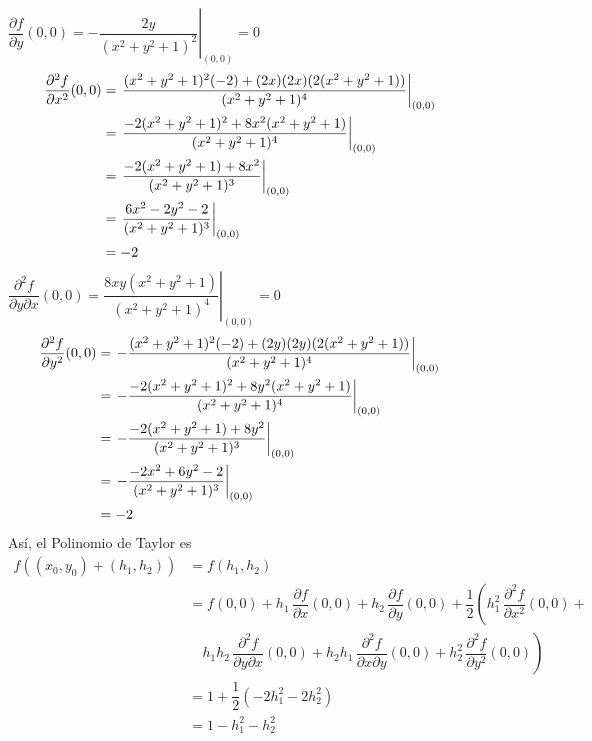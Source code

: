 \documentclass[fleqn, 12pt]{article}
\newcommand{\derivadaparcial}[2]{\dfrac{\partial {#1}}{\partial {#2}}}
\newcommand{\derivadaparcialn}[3]{\dfrac{\partial^{#3} {#1}}{\partial {#2}^{#3}}}
\newcommand{\derivadaparcialnd}[3]{\dfrac{\partial^{2} {#1}}{\partial {#3} \partial {#2}}}
\begin{document}
\begin{enumerate}
        $ \derivadaparcial{f}{y} (0,0) = \left. - \dfrac{2y}{(x^2 + y^2 + 1)^2} \right|_{(0,0)} = 0 $
        \begin{align*}
            \hspace{-10mm} \derivadaparcialn{f}{x}{2} (0,0) &= \left. \dfrac{(x^2 + y^2 + 1)^2 (-2) + (2x)(2x)(2(x^2 + y^2 + 1))}{(x^2 + y^2 + 1)^4} \right|_{(0,0)} \\
            &= \left. \dfrac{-2(x^2 + y^2 + 1)^2 + 8x^2 (x^2 + y^2 + 1)}{(x^2 + y^2 + 1)^4} \right|_{(0,0)} \\
            &= \left. \dfrac{-2(x^2 + y^2 + 1) + 8x^2}{(x^2 + y^2 + 1)^3} \right|_{(0,0)} \\
            &= \left. \dfrac{6x^2 - 2y^2 - 2}{(x^2 + y^2 + 1)^3} \right|_{(0,0)} \\
            &= -2
        \end{align*}
        $ \derivadaparcialnd{f}{x}{y} (0,0) = \left. \dfrac{8xy(x^2 + y^2 + 1)}{(x^2 + y^2 + 1)^4} \right|_{(0,0)} = 0 $
        \begin{align*}
            \hspace{-10mm} \derivadaparcialn{f}{y}{2} (0,0) &= \left. - \dfrac{(x^2 + y^2 + 1)^2 (-2) + (2y)(2y)(2(x^2 + y^2 + 1))}{(x^2 + y^2 + 1)^4} \right|_{(0,0)} \\
            &= \left. - \dfrac{-2(x^2 + y^2 + 1)^2 + 8y^2 (x^2 + y^2 + 1)}{(x^2 + y^2 + 1)^4} \right|_{(0,0)} \\
            &= \left. - \dfrac{-2(x^2 + y^2 + 1) + 8y^2}{(x^2 + y^2 + 1)^3} \right|_{(0,0)} \\
            &= \left. - \dfrac{-2x^2 + 6y^2 - 2}{(x^2 + y^2 + 1)^3} \right|_{(0,0)} \\
            &= -2
        \end{align*}
        Así, el Polinomio de Taylor es
        \begin{align*}
            f((x_0, y_0) + (h_1, h_2)) &= f(h_1, h_2) \\
            &= f(0,0) + h_1 \, \derivadaparcial{f}{x} (0,0) + h_2 \, \derivadaparcial{f}{y} (0,0) + \dfrac{1}{2} \left( h_1^2 \, \derivadaparcialn{f}{x}{2} (0,0) \right. + \\
            & \quad \left. h_1 h_2 \, \derivadaparcialnd{f}{x}{y} (0,0) + h_2 h_1 \, \derivadaparcialnd{f}{y}{x} (0,0) + h_2^2 \, \derivadaparcialn{f}{y}{2} (0,0) \right) \\
            &= 1 + \dfrac{1}{2} \left( -2 h_1^2 - 2 h_2^2 \right) \\
            &= 1 - h_1^2 - h_2^2
        \end{align*}


\end{enumerate}
\end{document}
